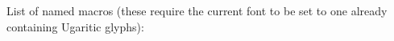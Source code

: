 \documentclass{article}
\begin{document}
\par
{}\par
{}\par
{}\par
{}\par
{}\par
{}\par
{}\par
{}\par
{}\par
{}\par
{}\par
{}\par
{}\par
{}\par
{}\par
{}\par
{}\par
{}\par
{}\par
{}\par
{}\par
{}\par
{}\par
{}\par
{}\par
{}\par
{}\par
{}\par
{}\par
{}\par

\bigskip
List of named macros (these require the current font to be set to one already containing Ugaritic glyphs):
\end{document}

